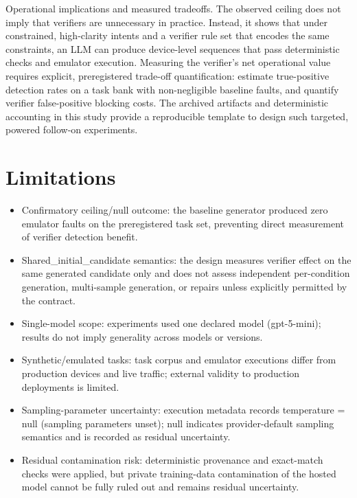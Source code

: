 \documentclass[conference]{IEEEtran}
\begin{document}
Operational implications and measured tradeoffs. The observed ceiling does not imply that verifiers are unnecessary in practice. Instead, it shows that under constrained, high-clarity intents and a verifier rule set that encodes the same constraints, an LLM can produce device-level sequences that pass deterministic checks and emulator execution. Measuring the verifier's net operational value requires explicit, preregistered trade-off quantification: estimate true-positive detection rates on a task bank with non-negligible baseline faults, and quantify verifier false-positive blocking costs. The archived artifacts and deterministic accounting in this study provide a reproducible template to design such targeted, powered follow-on experiments.

\section{Limitations}
\begin{itemize}
\item Confirmatory ceiling/null outcome: the baseline generator produced zero emulator faults on the preregistered task set, preventing direct measurement of verifier detection benefit.
\item Shared\_initial\_candidate semantics: the design measures verifier effect on the same generated candidate only and does not assess independent per-condition generation, multi-sample generation, or repairs unless explicitly permitted by the contract.
\item Single-model scope: experiments used one declared model (gpt-5-mini); results do not imply generality across models or versions.
\item Synthetic/emulated tasks: task corpus and emulator executions differ from production devices and live traffic; external validity to production deployments is limited.
\item Sampling-parameter uncertainty: execution metadata records temperature = null (sampling parameters unset); null indicates provider-default sampling semantics and is recorded as residual uncertainty.
\item Residual contamination risk: deterministic provenance and exact-match checks were applied, but private training-data contamination of the hosted model cannot be fully ruled out and remains residual uncertainty.
\end{itemize}
\end{document}

